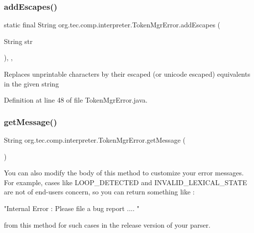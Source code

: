 \subsubsection{\texorpdfstring{add\+Escapes()}{addEscapes()}}
{\footnotesize\ttfamily static final String org.\+tec.\+comp.\+interpreter.\+Token\+Mgr\+Error.\+add\+Escapes (\begin{DoxyParamCaption}\item[{String}]{str }\end{DoxyParamCaption})\hspace{0.3cm}{\ttfamily [inline]}, {\ttfamily [static]}, {\ttfamily [protected]}}

Replaces unprintable characters by their escaped (or unicode escaped) equivalents in the given string 

Definition at line 48 of file Token\+Mgr\+Error.\+java.

\mbox{\label{classorg_1_1tec_1_1comp_1_1interpreter_1_1_token_mgr_error_a5c97cd3354418ad50461590b436a3cf7}} 
\subsubsection{\texorpdfstring{get\+Message()}{getMessage()}}
{\footnotesize\ttfamily String org.\+tec.\+comp.\+interpreter.\+Token\+Mgr\+Error.\+get\+Message (\begin{DoxyParamCaption}{ }\end{DoxyParamCaption})\hspace{0.3cm}{\ttfamily [inline]}}

You can also modify the body of this method to customize your error messages. For example, cases like L\+O\+O\+P\+\_\+\+D\+E\+T\+E\+C\+T\+ED and I\+N\+V\+A\+L\+I\+D\+\_\+\+L\+E\+X\+I\+C\+A\+L\+\_\+\+S\+T\+A\+TE are not of end-\/users concern, so you can return something like \+: \begin{DoxyVerb}"Internal Error : Please file a bug report .... "
\end{DoxyVerb}


from this method for such cases in the release version of your parser. 

